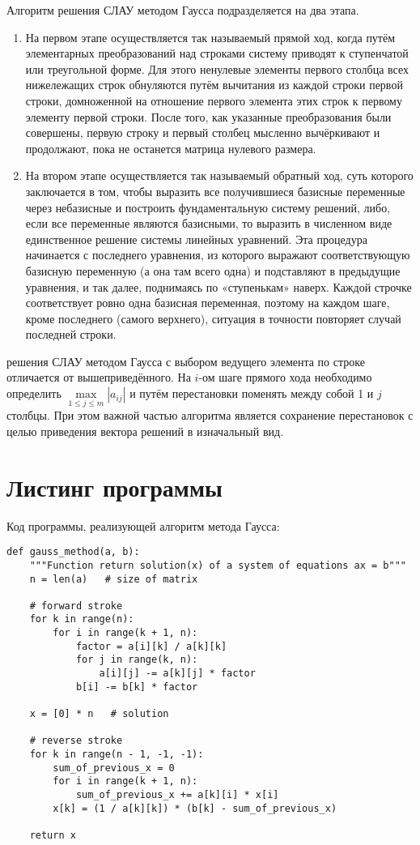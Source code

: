 \documentclass[12pt]{report}
\begin{document}
Алгоритм решения СЛАУ методом Гаусса подразделяется на два этапа.
\begin{enumerate}
    \item На первом этапе осуществляется так называемый прямой ход, когда путём элементарных преобразований над строками систему приводят к ступенчатой или треугольной форме. Для этого ненулевые элементы первого столбца всех нижележащих строк обнуляются путём вычитания из каждой строки первой строки, домноженной на отношение первого элемента этих строк к первому элементу первой строки. После того, как указанные преобразования были совершены, первую строку и первый столбец мысленно вычёркивают и продолжают, пока не останется матрица нулевого размера.
    \item На втором этапе осуществляется так называемый обратный ход, суть которого заключается в том, чтобы выразить все получившиеся базисные переменные через небазисные и построить фундаментальную систему решений, либо, если все переменные являются базисными, то выразить в численном виде единственное решение системы линейных уравнений. Эта процедура начинается с последнего уравнения, из которого выражают соответствующую базисную переменную (а она там всего одна) и подставляют в предыдущие уравнения, и так далее, поднимаясь по «ступенькам» наверх. Каждой строчке соответствует ровно одна базисная переменная, поэтому на каждом шаге, кроме последнего (самого верхнего), ситуация в точности повторяет случай последней строки.
\end{enumerate}
 решения СЛАУ методом Гаусса с выбором ведущего элемента по строке отличается от вышеприведённого. На $i$-ом шаге прямого хода необходимо определить $\max\limits_{1 \le j \le m}|a_{ij}|$ и путём перестановки поменять между собой 1 и $j$ столбцы. При этом важной частью алгоритма является сохранение перестановок с целью приведения вектора решений в изначальный вид.

\section{Листинг программы}

\lstset{language=Python}
\lstset{extendedchars=\true}

Код программы, реализующей алгоритм метода Гаусса: 

\begin{lstlisting}
def gauss_method(a, b):
    """Function return solution(x) of a system of equations ax = b"""
    n = len(a)   # size of matrix

    # forward stroke 
    for k in range(n):
        for i in range(k + 1, n):
            factor = a[i][k] / a[k][k]
            for j in range(k, n):
                a[i][j] -= a[k][j] * factor
            b[i] -= b[k] * factor

    x = [0] * n   # solution
    
    # reverse stroke
    for k in range(n - 1, -1, -1):
        sum_of_previous_x = 0
        for i in range(k + 1, n):
            sum_of_previous_x += a[k][i] * x[i]
        x[k] = (1 / a[k][k]) * (b[k] - sum_of_previous_x)

    return x
\end{lstlisting}
\end{document}
